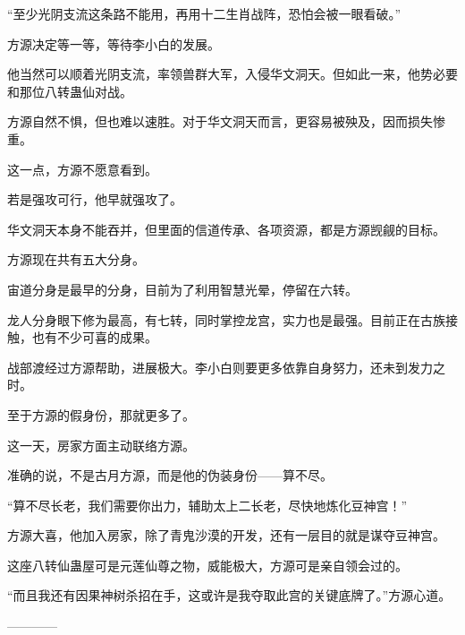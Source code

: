 \begin{this_body}
“至少光阴支流这条路不能用，再用十二生肖战阵，恐怕会被一眼看破。”

方源决定等一等，等待李小白的发展。

他当然可以顺着光阴支流，率领兽群大军，入侵华文洞天。但如此一来，他势必要和那位八转蛊仙对战。

方源自然不惧，但也难以速胜。对于华文洞天而言，更容易被殃及，因而损失惨重。

这一点，方源不愿意看到。

若是强攻可行，他早就强攻了。

华文洞天本身不能吞并，但里面的信道传承、各项资源，都是方源觊觎的目标。

方源现在共有五大分身。

宙道分身是最早的分身，目前为了利用智慧光晕，停留在六转。

龙人分身眼下修为最高，有七转，同时掌控龙宫，实力也是最强。目前正在古族接触，也有不少可喜的成果。

战部渡经过方源帮助，进展极大。李小白则要更多依靠自身努力，还未到发力之时。

至于方源的假身份，那就更多了。

这一天，房家方面主动联络方源。

准确的说，不是古月方源，而是他的伪装身份——算不尽。

“算不尽长老，我们需要你出力，辅助太上二长老，尽快地炼化豆神宫！”

方源大喜，他加入房家，除了青鬼沙漠的开发，还有一层目的就是谋夺豆神宫。

这座八转仙蛊屋可是元莲仙尊之物，威能极大，方源可是亲自领会过的。

“而且我还有因果神树杀招在手，这或许是我夺取此宫的关键底牌了。”方源心道。

------------

\end{this_body}

